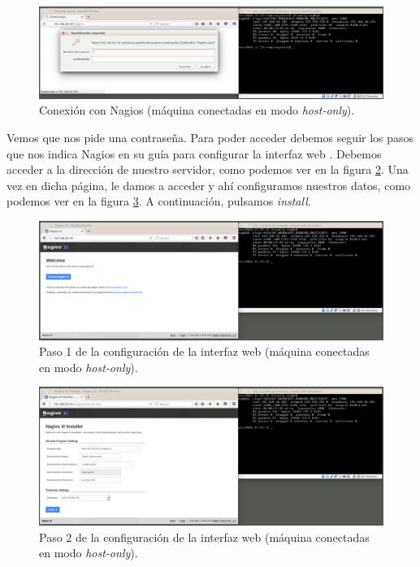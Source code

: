 \documentclass[a4paper,titlepage,12pt]{report}	%
\numberwithin{figure}{section} %
\numberwithin{table}{section} %
\begin{document}
	\begin{figure}[H]
	   \includegraphics[width=\linewidth]{./Imagenes/P3/O2-conexion.png}
	   \vspace{-0.5cm}
	   \caption[Conexión con Nagios (máquina conectadas en modo \textit{host-only}).]{Conexión con Nagios (máquina conectadas en modo \textit{host-only}).}
	   \label{P3-O2-conexion}
	\end{figure}

	Vemos que nos pide una contraseña. Para poder acceder debemos seguir los pasos que nos indica Nagios en su guía para configurar la interfaz web \cite{nagios2}. Debemos acceder a la dirección de nuestro servidor, como podemos ver en la figura \ref{P3-O2-web1}. Una vez en dicha página, le damos a acceder y ahí configuramos nuestros datos, como podemos ver en la figura \ref{P3-O2-web2}. A continuación, pulsamos \textit{install}.

	\begin{figure}[H]
	   \includegraphics[width=\linewidth]{./Imagenes/P3/O2-web1.png}
	   \vspace{-0.5cm}
	   \caption[Paso 1 de la configuración de la interfaz web (máquina conectadas en modo \textit{host-only}).]{Paso 1 de la configuración de la interfaz web (máquina conectadas en modo \textit{host-only}).}
	   \label{P3-O2-web1}
	\end{figure}

	\begin{figure}[H]
	   \includegraphics[width=\linewidth]{./Imagenes/P3/O2-web2.png}
	   \vspace{-0.5cm}
	   \caption[Paso 2 de la configuración de la interfaz web (máquina conectadas en modo \textit{host-only}).]{Paso 2 de la configuración de la interfaz web (máquina conectadas en modo \textit{host-only}).}
	   \label{P3-O2-web2}
	\end{figure}
\end{document}
